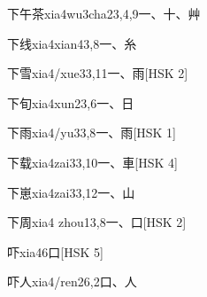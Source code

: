 \begin{EntryWithPhonetic}{下午茶}{xia4wu3cha2}{3,4,9}{⼀、⼗、⾋}
\end{EntryWithPhonetic}

\begin{EntryWithPhonetic}{下线}{xia4xian4}{3,8}{⼀、⽷}
\end{EntryWithPhonetic}

\begin{EntryWithPhonetic}{下雪}{xia4/xue3}{3,11}{⼀、⾬}[HSK 2]
\end{EntryWithPhonetic}

\begin{EntryWithPhonetic}{下旬}{xia4xun2}{3,6}{⼀、⽇}
\end{EntryWithPhonetic}

\begin{EntryWithPhonetic}{下雨}{xia4/yu3}{3,8}{⼀、⾬}[HSK 1]
\end{EntryWithPhonetic}

\begin{EntryWithPhonetic}{下载}{xia4zai3}{3,10}{⼀、⾞}[HSK 4]
\end{EntryWithPhonetic}

\begin{EntryWithPhonetic}{下崽}{xia4zai3}{3,12}{⼀、⼭}
\end{EntryWithPhonetic}

\begin{EntryWithPhonetic}{下周}{xia4 zhou1}{3,8}{⼀、⼝}[HSK 2]
\end{EntryWithPhonetic}

\begin{EntryWithPhonetic}{吓}{xia4}{6}{⼝}[HSK 5]
\end{EntryWithPhonetic}

\begin{EntryWithPhonetic}{吓人}{xia4/ren2}{6,2}{⼝、⼈}
\end{EntryWithPhonetic}

